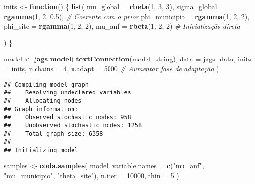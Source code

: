\documentclass[
]{article}
\newenvironment{Shaded}{\begin{snugshade}}{\end{snugshade}}
\newcommand{\AttributeTok}[1]{\textcolor[rgb]{0.13,0.29,0.53}{#1}}
\newcommand{\CommentTok}[1]{\textcolor[rgb]{0.56,0.35,0.01}{\textit{#1}}}
\newcommand{\ControlFlowTok}[1]{\textcolor[rgb]{0.13,0.29,0.53}{\textbf{#1}}}
\newcommand{\DecValTok}[1]{\textcolor[rgb]{0.00,0.00,0.81}{#1}}
\newcommand{\FloatTok}[1]{\textcolor[rgb]{0.00,0.00,0.81}{#1}}
\newcommand{\FunctionTok}[1]{\textcolor[rgb]{0.13,0.29,0.53}{\textbf{#1}}}
\newcommand{\NormalTok}[1]{#1}
\newcommand{\OtherTok}[1]{\textcolor[rgb]{0.56,0.35,0.01}{#1}}
\newcommand{\StringTok}[1]{\textcolor[rgb]{0.31,0.60,0.02}{#1}}
\begin{document}
\begin{Shaded}
\begin{Highlighting}[]
\NormalTok{inits }\OtherTok{\textless{}{-}} \ControlFlowTok{function}\NormalTok{() \{}
  \FunctionTok{list}\NormalTok{(}
    \AttributeTok{mu\_global =} \FunctionTok{rbeta}\NormalTok{(}\DecValTok{1}\NormalTok{, }\DecValTok{3}\NormalTok{, }\DecValTok{3}\NormalTok{),}
    \AttributeTok{sigma\_global =} \FunctionTok{rgamma}\NormalTok{(}\DecValTok{1}\NormalTok{, }\DecValTok{2}\NormalTok{, }\FloatTok{0.5}\NormalTok{),  }\CommentTok{\# Coerente com o prior}
    \AttributeTok{phi\_municipio =} \FunctionTok{rgamma}\NormalTok{(}\DecValTok{1}\NormalTok{, }\DecValTok{2}\NormalTok{, }\DecValTok{2}\NormalTok{),}
    \AttributeTok{phi\_site =} \FunctionTok{rgamma}\NormalTok{(}\DecValTok{1}\NormalTok{, }\DecValTok{2}\NormalTok{, }\DecValTok{2}\NormalTok{),}
    \AttributeTok{mu\_anf =} \FunctionTok{rbeta}\NormalTok{(}\DecValTok{1}\NormalTok{, }\DecValTok{2}\NormalTok{, }\DecValTok{2}\NormalTok{)  }\CommentTok{\# Inicialização direta}
    
\NormalTok{  )}
\NormalTok{\}}

\NormalTok{model }\OtherTok{\textless{}{-}} \FunctionTok{jags.model}\NormalTok{(}
  \FunctionTok{textConnection}\NormalTok{(model\_string),}
  \AttributeTok{data =}\NormalTok{ jags\_data,}
  \AttributeTok{inits =}\NormalTok{ inits,}
  \AttributeTok{n.chains =} \DecValTok{4}\NormalTok{,}
  \AttributeTok{n.adapt =} \DecValTok{5000}  \CommentTok{\# Aumentar fase de adaptação}
\NormalTok{)}
\end{Highlighting}
\end{Shaded}

\begin{verbatim}
## Compiling model graph
##    Resolving undeclared variables
##    Allocating nodes
## Graph information:
##    Observed stochastic nodes: 958
##    Unobserved stochastic nodes: 1258
##    Total graph size: 6358
## 
## Initializing model
\end{verbatim}

\begin{Shaded}
\begin{Highlighting}[]
\NormalTok{samples }\OtherTok{\textless{}{-}} \FunctionTok{coda.samples}\NormalTok{(}
\NormalTok{  model,}
  \AttributeTok{variable.names =} \FunctionTok{c}\NormalTok{(}\StringTok{"mu\_anf"}\NormalTok{, }\StringTok{"mu\_municipio"}\NormalTok{, }\StringTok{"theta\_site"}\NormalTok{),}
  \AttributeTok{n.iter =} \DecValTok{10000}\NormalTok{,}
  \AttributeTok{thin =} \DecValTok{5}
\NormalTok{)}
\end{Highlighting}
\end{Shaded}
\end{document}
